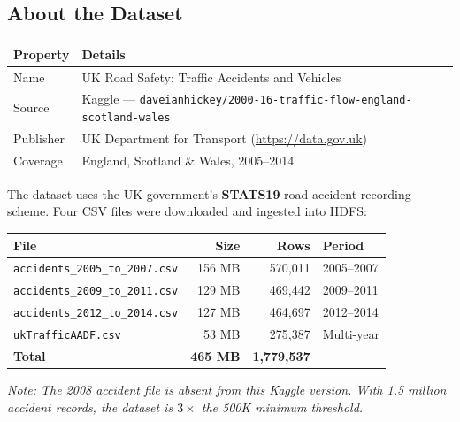 \documentclass[12pt, a4paper]{article}
\begin{document}
\subsection{About the Dataset}

\begin{center}
\renewcommand{\arraystretch}{1.3}
\begin{tabular}{@{} L{3.5cm} L{10cm} @{}}
\toprule
\textbf{Property} & \textbf{Details} \\
\midrule
{}
Name       & UK Road Safety: Traffic Accidents and Vehicles \\
Source     & Kaggle — \texttt{daveianhickey/2000-16-traffic-flow-england-scotland-wales} \\
Publisher  & UK Department for Transport (\url{https://data.gov.uk}) \\
Coverage   & England, Scotland \& Wales, 2005–2014 \\
\bottomrule
\end{tabular}
\end{center}

\vspace{4pt}
The dataset uses the UK government's \textbf{STATS19} road accident recording scheme.
Four CSV files were downloaded and ingested into HDFS:

\vspace{4pt}
\begin{center}
\renewcommand{\arraystretch}{1.3}
\begin{tabular}{L{5.6cm} r r C{2.8cm}}
\toprule
\textbf{File} & \textbf{Size} & \textbf{Rows} & \textbf{Period} \\
\midrule
{}
\texttt{accidents\_2005\_to\_2007.csv} & 156 MB & 570,011 & 2005–2007 \\
\texttt{accidents\_2009\_to\_2011.csv} & 129 MB & 469,442 & 2009–2011 \\
\texttt{accidents\_2012\_to\_2014.csv} & 127 MB & 464,697 & 2012–2014 \\
\texttt{ukTrafficAADF.csv}             &  53 MB & 275,387 & Multi-year \\
\midrule
\textbf{Total} & \textbf{465 MB} & \textbf{1,779,537} & \\
\bottomrule
\end{tabular}
\end{center}

\vspace{4pt}
\textit{Note: The 2008 accident file is absent from this Kaggle version.
With 1.5 million accident records, the dataset is $3\times$ the 500K minimum threshold.}
\end{document}
